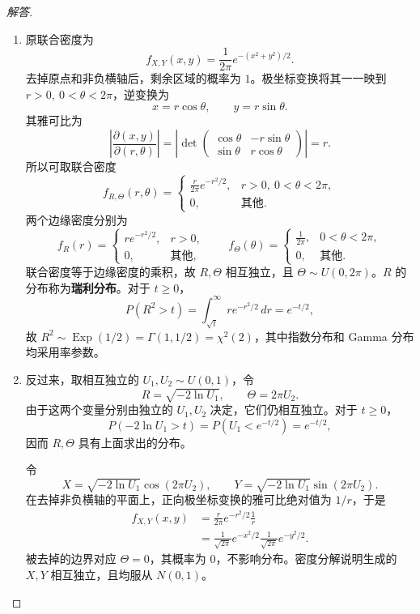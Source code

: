 \begin{proof}[解答]
\begin{enumerate}
\item 原联合密度为
\[
f_{X,Y}(x,y)=\frac{1}{2\pi}e^{-(x^2+y^2)/2}.
\]
去掉原点和非负横轴后，剩余区域的概率为 $1$。极坐标变换将其一一映到 $r>0,\ 0<\theta<2\pi$，逆变换为
\[
x=r\cos\theta,\qquad y=r\sin\theta.
\]
其雅可比为
\[
\left|\frac{\partial(x,y)}{\partial(r,\theta)}\right|
=\left|\det
\begin{pmatrix}
\cos\theta&-r\sin\theta\\
\sin\theta&r\cos\theta
\end{pmatrix}\right|=r.
\]
所以可取联合密度
\[
f_{R,\Theta}(r,\theta)=
\begin{cases}
\displaystyle\frac{r}{2\pi}e^{-r^2/2},&r>0,\ 0<\theta<2\pi,\\
0,&\text{其他}.
\end{cases}
\]
两个边缘密度分别为
\[
f_R(r)=
\begin{cases}re^{-r^2/2},&r>0,\\0,&\text{其他},\end{cases}
\qquad
f_\Theta(\theta)=
\begin{cases}\displaystyle\frac{1}{2\pi},&0<\theta<2\pi,\\0,&\text{其他}.\end{cases}
\]
联合密度等于边缘密度的乘积，故 $R,\Theta$ 相互独立，且 $\Theta\sim U(0,2\pi)$。$R$ 的分布称为\textbf{瑞利分布}。对于 $t\geq0$，
\[
P(R^2>t)=\int_{\sqrt t}^{\infty}re^{-r^2/2}\,dr=e^{-t/2},
\]
故 $R^2\sim\operatorname{Exp}(1/2)=\Gamma(1,1/2)=\chi^2(2)$，其中指数分布和 Gamma 分布均采用率参数。

\item 反过来，取相互独立的 $U_1,U_2\sim U(0,1)$，令
\[
R=\sqrt{-2\ln U_1},\qquad \Theta=2\pi U_2.
\]
由于这两个变量分别由独立的 $U_1,U_2$ 决定，它们仍相互独立。对于 $t\geq0$，
\[
P(-2\ln U_1>t)=P(U_1<e^{-t/2})=e^{-t/2},
\]
因而 $R,\Theta$ 具有上面求出的分布。

令
\[
X=\sqrt{-2\ln U_1}\cos(2\pi U_2),\qquad
Y=\sqrt{-2\ln U_1}\sin(2\pi U_2).
\]
在去掉非负横轴的平面上，正向极坐标变换的雅可比绝对值为 $1/r$，于是
\begin{align*}
f_{X,Y}(x,y)
&=\frac{r}{2\pi}e^{-r^2/2}\frac1r\\
&=\frac{1}{\sqrt{2\pi}}e^{-x^2/2}
  \frac{1}{\sqrt{2\pi}}e^{-y^2/2}.
\end{align*}
被去掉的边界对应 $\Theta=0$，其概率为 $0$，不影响分布。密度分解说明生成的 $X,Y$ 相互独立，且均服从 $N(0,1)$。
\end{enumerate}
\end{proof}


